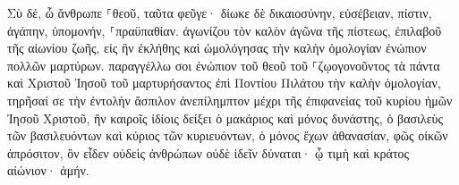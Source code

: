 \documentclass{openreader}
\begin{document}
Σὺ δέ, ὦ ἄνθρωπε ⸀θεοῦ, ταῦτα φεῦγε· δίωκε δὲ δικαιοσύνην, εὐσέβειαν, πίστιν, ἀγάπην, ὑπομονήν, ⸀πραϋπαθίαν. 
ἀγωνίζου τὸν καλὸν ἀγῶνα τῆς πίστεως, ἐπιλαβοῦ τῆς αἰωνίου ζωῆς, εἰς ἣν ἐκλήθης καὶ ὡμολόγησας τὴν καλὴν ὁμολογίαν ἐνώπιον πολλῶν μαρτύρων. 
παραγγέλλω σοι ἐνώπιον τοῦ θεοῦ τοῦ ⸀ζῳογονοῦντος τὰ πάντα καὶ Χριστοῦ Ἰησοῦ τοῦ μαρτυρήσαντος ἐπὶ Ποντίου Πιλάτου τὴν καλὴν ὁμολογίαν, 
τηρῆσαί σε τὴν ἐντολὴν ἄσπιλον ἀνεπίλημπτον μέχρι τῆς ἐπιφανείας τοῦ κυρίου ἡμῶν Ἰησοῦ Χριστοῦ, 
ἣν καιροῖς ἰδίοις δείξει ὁ μακάριος καὶ μόνος δυνάστης, ὁ βασιλεὺς τῶν βασιλευόντων καὶ κύριος τῶν κυριευόντων, 
ὁ μόνος ἔχων ἀθανασίαν, φῶς οἰκῶν ἀπρόσιτον, ὃν εἶδεν οὐδεὶς ἀνθρώπων οὐδὲ ἰδεῖν δύναται· ᾧ τιμὴ καὶ κράτος αἰώνιον· ἀμήν. 
\end{document}
